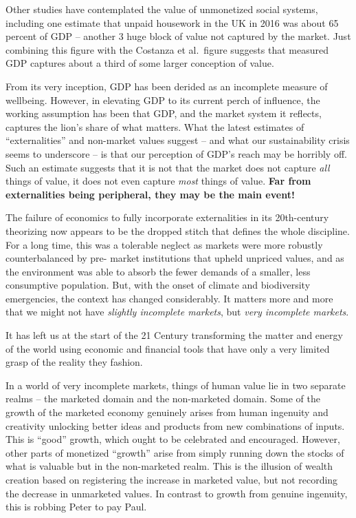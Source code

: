 \documentclass[
]{book}
\begin{document}
Other studies have contemplated the value of unmonetized social systems, including one
estimate that unpaid housework in the UK in 2016 was about 65 percent of GDP -- another
3
huge block of value not captured by the market. Just combining this figure with the Costanza
et al.~figure suggests that measured GDP captures about a third of some larger conception of
value.

From its very inception, GDP has been derided as an incomplete measure of wellbeing.
However, in elevating GDP to its current perch of influence, the working assumption has been
that GDP, and the market system it reflects, captures the lion's share of what matters. What
the latest estimates of ``externalities'' and non-market values suggest -- and what our
sustainability crisis seems to underscore -- is that our perception of GDP's reach may be
horribly off. Such an estimate suggests that it is not that the market does not capture \emph{all} things of value, it does not even capture \emph{most} things of value.
\textbf{Far from externalities being peripheral, they may be the main event!}

The failure of economics to fully incorporate externalities in its 20th-century
theorizing now appears to be the dropped stitch that defines the whole discipline. For a long
time, this was a tolerable neglect as markets were more robustly counterbalanced by pre-
market institutions that upheld unpriced values, and as the environment was able to absorb
the fewer demands of a smaller, less consumptive population. But, with the onset of climate
and biodiversity emergencies, the context has changed considerably. It matters more and
more that we might not have \emph{slightly incomplete markets}, but \emph{very incomplete markets}.

It has left us at the start of the 21 Century transforming
the matter and energy of the world using
economic and financial tools that have only
a very limited grasp of the reality they fashion.

In a world of very incomplete markets, things of human value lie in two separate realms -- the
marketed domain and the non-marketed domain. Some of the growth of the marketed
economy genuinely arises from human ingenuity and creativity unlocking better ideas and
products from new combinations of inputs. This is ``good'' growth, which ought to be
celebrated and encouraged. However, other parts of monetized ``growth'' arise from simply
running down the stocks of what is valuable but in the non-marketed realm. This is the illusion
of wealth creation based on registering the increase in marketed value, but not recording the
decrease in unmarketed values. In contrast to growth from genuine ingenuity, this is robbing
Peter to pay Paul.
\end{document}
